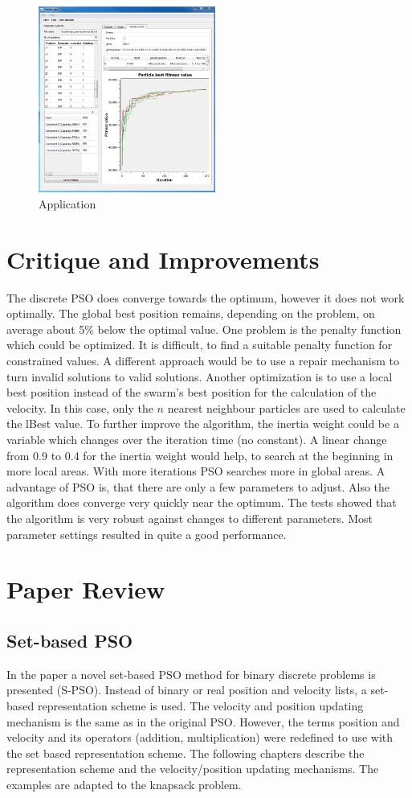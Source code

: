 \documentclass{article}
\begin{document}
\begin{figure}[H]
    \centering
    \includegraphics[width=220px]{images/image_main.PNG}
    \caption{Application}
    \label{fig-app}
\end{figure}

\section{Critique and Improvements}
\label{lbl-impr}
The discrete PSO does converge towards the optimum, however it does not work optimally. The global best position remains, depending on the problem, on average about 5\% below the optimal value. One problem is the penalty function which could be optimized. It is difficult, to find a suitable penalty function for constrained values. A different approach would be to use a repair mechanism to turn invalid solutions to valid solutions. Another optimization is to use a local best position instead of the swarm's best position for the calculation of the velocity. In this case, only the $n$ nearest neighbour particles are used to calculate the lBest value. To further improve the algorithm, the inertia weight could be a variable which changes over the iteration time (no constant). A linear change from 0.9 to 0.4 for the inertia weight would help, to search at the beginning in more local areas. With more iterations PSO searches more in global areas. A advantage of PSO is, that there are only a few parameters to adjust. Also the algorithm does converge very quickly near the optimum. The tests showed that the algorithm is very robust against changes to different parameters. Most parameter settings resulted in quite a good performance.

\section{Paper Review}
\label{lbl-rev}
\subsection{Set-based PSO}
In the paper \cite{bib-sets} a novel set-based PSO method for binary discrete problems is presented (S-PSO). Instead of binary or real position and velocity lists, a set-based representation scheme is used. The velocity and position updating mechanism is the same as in the original PSO. However, the terms position and velocity and its operators (addition, multiplication) were redefined to use with the set based representation scheme. The following chapters describe the representation scheme and the velocity/position updating mechanisms. The examples are adapted to the knapsack problem.
\end{document}
